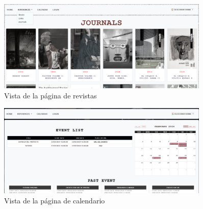 \documentclass[a4paper, 12pt]{book}
\begin{document}
\begin{figure}
  \centering
  \includegraphics[width=0.9\textwidth]{img/revistassitio.png}
  \caption{Vista de la página de revistas}
  \label{fig:sitiojournals}
\end{figure}

\begin{figure}
  \centering
  \includegraphics[width=0.9\textwidth]{img/calendarsitio.png}
  \caption{Vista de la página de calendario}
  \label{fig:sitiocalendar}
\end{figure}
\end{document}
